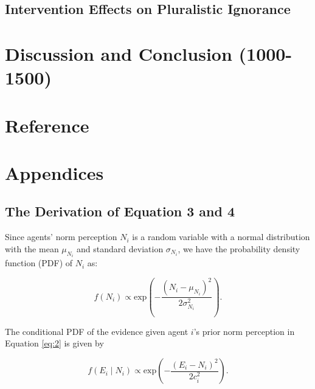 \documentclass[
  11pt,
]{article}
\begin{document}
\hypertarget{intervention-effects-on-pluralistic-ignorance}{%
\subsection{Intervention Effects on Pluralistic
Ignorance}\label{intervention-effects-on-pluralistic-ignorance}}

\hypertarget{discussion-and-conclusion-1000-1500}{%
\section{Discussion and Conclusion
(1000-1500)}\label{discussion-and-conclusion-1000-1500}}

\newpage

\hypertarget{reference}{%
\section*{Reference}\label{reference}}

\newpage

\hypertarget{appendices}{%
\section*{Appendices}\label{appendices}}

\hypertarget{the-derivation-of-equation-3-and-4}{%
\subsection*{The Derivation of Equation 3 and
4}\label{the-derivation-of-equation-3-and-4}}

Since agents' norm perception \(N_i\) is a random variable with a normal
distribution with the mean \(\mu_{N_i}\) and standard deviation
\(\sigma_{N_i}\), we have the probability density function (PDF) of
\(N_i\) as:

\begin{equation*}
f(N_i) \propto \text{exp}(-\frac{(N_i - \mu_{N_i})^2}{2\sigma_{N_i}^2}).
\end{equation*}

The conditional PDF of the evidence given agent \(i\)'s prior norm
perception in Equation \ref{eq:2} is given by

\begin{equation*}
f(E_i \mid N_i) \propto \text{exp}(-\frac{(E_i - N_i)^2}{2c_i^2}).
\end{equation*}
\end{document}
